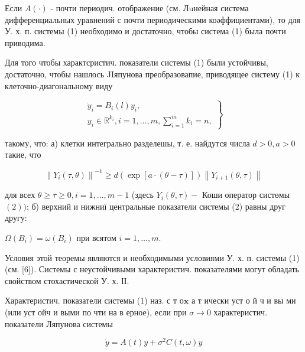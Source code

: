 \documentclass[10pt]{article}
\begin{document}
Если $A(\cdot)$ - почти периодич. отображение (см. Лuнейная система дифференциальных уравнений $с$ почти периодическими коәффициентами), то для У. х. п. системы (1) необходимо и достаточно, чтобы система (1) была почти приводима.



Для того чтобы характсристич. показатели системы (1) были устойчивы, достаточно, чтобы нашлось JIяпунова преобразовапие, приводящее систему (1) к клеточно-диагональному виду



\[

\left.\begin{array}{c}

\dot{y}_{i}=B_{i}(l) y_{i}, \\

y_{i} \in \mathbb{R}^{k_{i}}, i=1, \ldots, m, \sum_{i=1}^{m} k_{i}=n,

\end{array}\right\}

\]



такому, что: а) клетки интегрально разделешы, т. е. найдутся числа $d>0, a>0$ такие, что



\[

\left\|Y_{i}(\tau, \theta)\right\|^{-1} \geqslant d(\exp [a \cdot(\theta-\tau)])\left\|Y_{i+1}(\theta, \tau)\right\|

\]



для всех $\theta \geqslant \tau \geqslant 0, i=1, \ldots, m-1$ (здесь $Y_{i}(\theta, \tau)-$ Коши оператор систөмы $(2))$; б) верхний и нижниї центральные показатели системы (2) равны друг другу:



$\Omega\left(B_{i}\right)=\omega\left(B_{i}\right)$ при всятом $i=1, \ldots, m$.



Условия этой теоремы являются и необходимыми условиями У. х. п. системы (1) (см. [6]). Системы с неустойчивыми характеристич. показателями могут обладать свойством стохастической У. х. ІІ.



Характеристич. показатели системы (1) наз. с т о$\mathbf{x}$ а т ически уст о й ч и вы ми (или уст ойч и выми по чти на в ерное), если при $\sigma \rightarrow 0$ характеристич. показатели Ляпунова системы



\[

\dot{y}=A(t) y+\sigma^{2} C(t, \omega) y

\]
\end{document}
